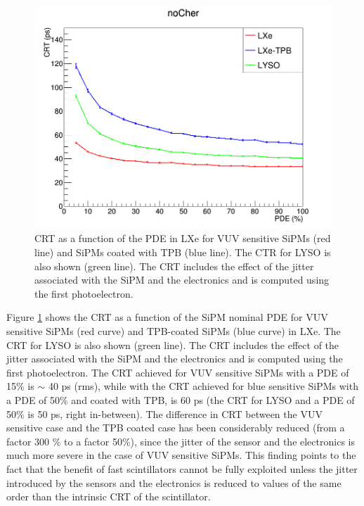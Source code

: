 \documentclass[review]{elsarticle}
\begin{document}
{ \begin{figure}[!bhtp]
	\centering
	\includegraphics[scale=3]{../img/CTR_jitter_fixed_n.png}
	\caption{\label{fig.crt3} CRT as a function of the PDE in LXe for VUV sensitive SiPMs (red line) and SiPMs coated with TPB (blue line). The CTR for LYSO is also shown (green line). The CRT includes the
	effect of the jitter associated with the SiPM and the electronics and is computed using the first photoelectron.}
\end{figure}

Figure \ref{fig.crt3} shows the CRT as a function of the
 SiPM nominal PDE for VUV sensitive SiPMs (red curve) and TPB-coated SiPMs (blue curve) in LXe. The CRT for LYSO is also shown (green line). The CRT includes the
effect of the jitter associated with the SiPM and the electronics and is computed using the first photoelectron.
The CRT achieved for VUV sensitive SiPMs with a PDE of 15\% is $\sim$ 40 ps (rms), while with the CRT achieved for blue sensitive SiPMs with a PDE of 50\% and coated with TPB, is 60 ps (the CRT for LYSO and a PDE of 50\% is 50 ps, right in-between). The difference in CRT between the VUV sensitive case and the TPB coated case has been considerably reduced (from a factor 300 \% to a factor 50\%), since the jitter of the sensor and the electronics is much more severe in the case of VUV sensitive SiPMs. This finding points to the fact that the benefit of fast scintillators cannot be fully exploited unless the jitter introduced by the sensors and the electronics is reduced to values of the same order than the intrinsic CRT of the scintillator. 

}
\end{document}

